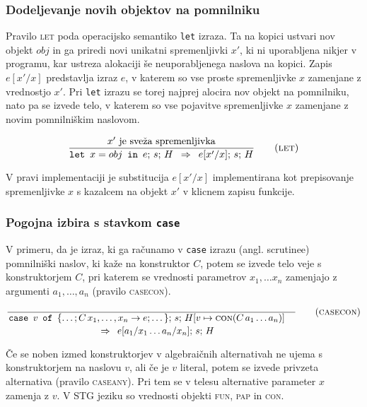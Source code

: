 \subsubsection{Dodeljevanje novih objektov na pomnilniku}

Pravilo \textsc{let} poda operacijsko semantiko \texttt{let} izraza. Ta na kopici ustvari nov objekt $obj$ in ga priredi novi unikatni spremenljivki $x'$, ki ni uporabljena nikjer v programu, kar ustreza alokaciji še neuporabljenega naslova na kopici. Zapis $e[x' / x]$ predstavlja izraz $e$, v katerem so vse proste spremenljivke $x$ zamenjane z vrednostjo $x'$. Pri \texttt{let} izrazu se torej najprej alocira nov objekt na pomnilniku, nato pa se izvede telo, v katerem so vse pojavitve spremenljivke $x$ zamenjane z novim pomnilniškim naslovom.

\begin{equation}
\infer[let]{
	\text{$x'$ je sveža spremenljivka}
}{
	\texttt{let} \enspace x = obj \enspace \texttt{in} \enspace e; \, s; \, H
}{
	e[x'/x]; \, s; \, H
}
\end{equation}

V pravi implementaciji je substitucija $e[x'/x]$ implementirana kot prepisovanje spremenljivke $x$ s kazalcem na objekt $x'$ v klicnem zapisu funkcije.

\subsubsection{Pogojna izbira s stavkom \texttt{case}}

V primeru, da je izraz, ki ga računamo v \texttt{case} izrazu (angl. scrutinee) pomnilniški naslov, ki kaže na konstruktor $C$, potem se izvede telo veje s konstruktorjem $C$, pri katerem se vrednosti parametrov $x_1, \dots x_n$ zamenjajo z argumenti $a_1, \dots, a_n$ (pravilo \textsc{casecon}).

\begin{equation}
	\linfer[casecon]{}{
		\texttt{case} \enspace v \enspace \texttt{of} \enspace \{ \dots; C \, x_1, \dots, x_n \to e; \dots \}; \, s; \, H[v \mapsto \textsc{con}(C \, a_1 \dots a_n)]
	}{
		e[a_1 / x_1 \dots a_n / x_n]; \, s; \, H
	}
\end{equation}

Če se noben izmed konstruktorjev v algebraičnih alternativah ne ujema s konstruktorjem na naslovu $v$, ali če je $v$ literal, potem se izvede privzeta alternativa (pravilo \textsc{caseany}). Pri tem se v telesu alternative parameter $x$ zamenja z $v$. V STG jeziku so vrednosti objekti \textsc{fun}, \textsc{pap} in \textsc{con}.


